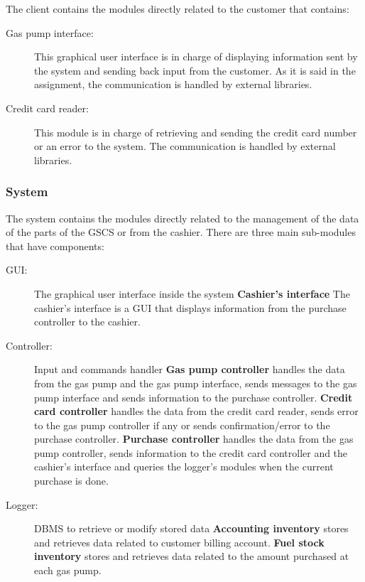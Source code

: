 \documentclass[a4paper, 11pt]{article}
\begin{document}
    The client contains the modules directly related to the
    customer that contains:

    \begin{description}
        \item[Gas pump interface:] This graphical user interface is in charge of
        displaying information sent by the system and sending back input from
        the customer. As it is said in the assignment, the communication is
        handled by external libraries.
        \item[Credit card reader:] This module is in charge of retrieving and
        sending the credit card number or an error to the system. The
        communication is handled by external libraries.
    \end{description}

    \subsubsection{System}

    The system contains the modules directly related to the management of the
    data of the parts of the GSCS or from the cashier. There are three main
    sub-modules that have components:

    \begin{description}
        \item[GUI:] The graphical user interface inside the system
            \subitem\textbf{Cashier's interface} The cashier's interface is a
            GUI that displays information from the purchase controller to the
            cashier.
        \item[Controller:] Input and commands handler
            \subitem\textbf{Gas pump controller} handles the data from the gas
            pump and the gas pump interface, sends messages to the gas pump
            interface and sends information to the purchase controller.
            \subitem\textbf{Credit card controller} handles the data from the
            credit card reader, sends error to the gas pump controller if any
            or sends confirmation/error to the purchase controller.
            \subitem\textbf{Purchase controller} handles the data from the gas
            pump controller, sends information to the credit card controller
            and the cashier's interface and queries the logger's modules when
            the current purchase is done.
        \item[Logger:] DBMS to retrieve or modify stored data
            \subitem\textbf{Accounting inventory} stores and retrieves data
            related to customer billing account.
            \subitem\textbf{Fuel stock inventory} stores and retrieves data
            related to the amount purchased at each gas pump.
    \end{description}
\end{document}
